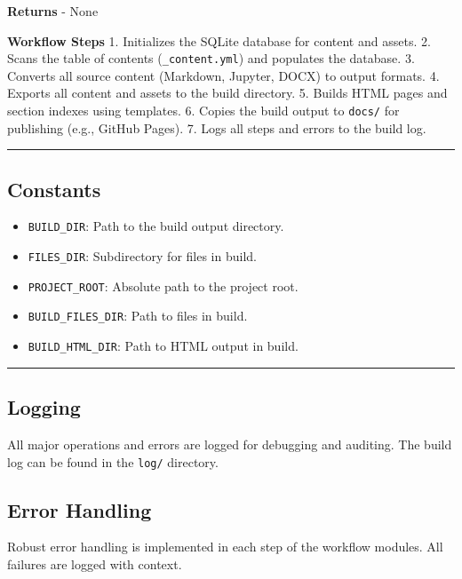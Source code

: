 \textbf{Returns} - None

\textbf{Workflow Steps} 1. Initializes the SQLite database for content
and assets. 2. Scans the table of contents (\texttt{\_content.yml}) and
populates the database. 3. Converts all source content (Markdown,
Jupyter, DOCX) to output formats. 4. Exports all content and assets to
the build directory. 5. Builds HTML pages and section indexes using
templates. 6. Copies the build output to \texttt{docs/} for publishing
(e.g., GitHub Pages). 7. Logs all steps and errors to the build log.

\begin{center}\rule{0.5\linewidth}{0.5pt}\end{center}

\subsection{Constants}\label{constants}

\begin{itemize}
\tightlist
\item
  \texttt{BUILD\_DIR}: Path to the build output directory.
\item
  \texttt{FILES\_DIR}: Subdirectory for files in build.
\item
  \texttt{PROJECT\_ROOT}: Absolute path to the project root.
\item
  \texttt{BUILD\_FILES\_DIR}: Path to files in build.
\item
  \texttt{BUILD\_HTML\_DIR}: Path to HTML output in build.
\end{itemize}

\begin{center}\rule{0.5\linewidth}{0.5pt}\end{center}

\subsection{Logging}\label{logging}

All major operations and errors are logged for debugging and auditing.
The build log can be found in the \texttt{log/} directory.

\subsection{Error Handling}\label{error-handling}

Robust error handling is implemented in each step of the workflow
modules. All failures are logged with context.

